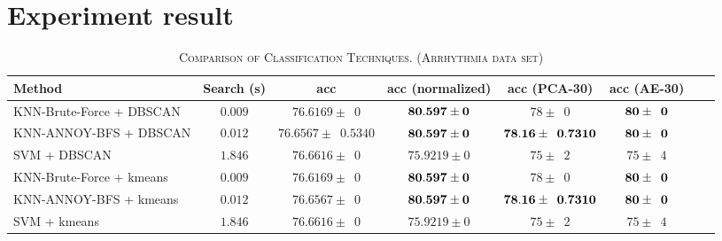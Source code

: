 \documentclass[twocolumn,10pt]{article}
\begin{document}
\section{Experiment result}
  \begin{table*}[htb]
    \newcommand{\z}{\phantom{0}}
    \caption{\textsc{Comparison of Classification Techniques. (Arrhythmia data set)}}
      \vspace{-\baselineskip}
    \begin{tabular}{@{}lccccccl@{}}\toprule
    Method                    & Search (s) & acc                               & acc (normalized)             & acc (PCA-30)                   & acc (AE-30)\\ \midrule
    KNN-Brute-Force + DBSCAN  & $0.009$   & $76.6169 \pm \z{0}$                & $\bf{80.597 \pm 0}$          & $78 \pm \z{0}$                 & $\bf{80 \pm \z{0}}$\\
    KNN-ANNOY-BFS + DBSCAN    & $0.012$   & $76.6567 \pm \z{0.5340}$           & $\bf{80.597 \pm 0}$          & $\bf{78.16 \pm \z{0.7310}}$    & $\bf{80 \pm \z{0}}$\\
    SVM + DBSCAN              & $1.846$   & $76.6616 \pm \z{0}$                & $75.9219 \pm 0$              & $75 \pm \z{2}$                 & $75 \pm \z{4}$\\
    KNN-Brute-Force + kmeans  & $0.009$   & $76.6169 \pm \z{0}$                & $\bf{80.597 \pm 0}$          & $78 \pm \z{0}$                 & $\bf{80 \pm \z{0}}$\\
    KNN-ANNOY-BFS + kmeans    & $0.012$   & $76.6567 \pm \z{0}$                & $\bf{80.597 \pm 0}$          & $\bf{78.16 \pm \z{0.7310}}$    & $\bf{80 \pm \z{0}}$\\
    SVM + kmeans              & $1.846$   & $76.6616 \pm \z{0}$                & $75.9219 \pm 0$              & $75 \pm \z{2}$                 & $75 \pm \z{4}$\\
    \end{tabular}
    \label{table:Arrhythmia_result}
      \vspace{-\baselineskip}
  \end{table*}
\end{document}
